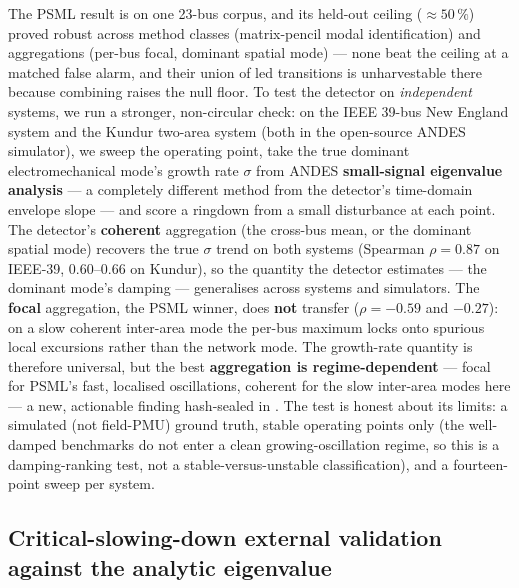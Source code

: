 \documentclass[11pt]{article}
\begin{document}
The PSML result is on one 23-bus corpus, and its held-out ceiling
($\approx 50\,\%$) proved robust across method classes (matrix-pencil
modal identification) and aggregations (per-bus focal, dominant spatial
mode) --- none beat the ceiling at a matched false alarm, and their
union of led transitions is unharvestable there because combining raises
the null floor. To test the detector on \emph{independent} systems, we
run a stronger, non-circular check: on the IEEE 39-bus New England
system and the Kundur two-area system (both in the open-source ANDES
simulator), we sweep the operating point, take the true dominant
electromechanical mode's growth rate $\sigma$ from ANDES
\textbf{small-signal eigenvalue analysis} --- a completely different
method from the detector's time-domain envelope slope --- and score a
ringdown from a small disturbance at each point. The detector's
\textbf{coherent} aggregation (the cross-bus mean, or the dominant
spatial mode) recovers the true $\sigma$ trend on both systems (Spearman
$\rho = 0.87$ on IEEE-39, 0.60--0.66 on Kundur), so the quantity the
detector estimates --- the dominant mode's damping --- generalises
across systems and simulators. The \textbf{focal} aggregation, the PSML
winner, does \textbf{not} transfer ($\rho = -0.59$ and $-0.27$): on a
slow coherent inter-area mode the per-bus maximum locks onto spurious
local excursions rather than the network mode. The growth-rate quantity
is therefore universal, but the best \textbf{aggregation is
regime-dependent} --- focal for PSML's fast, localised oscillations,
coherent for the slow inter-area modes here --- a new, actionable
finding hash-sealed in
.
The test is honest about its limits: a simulated (not field-PMU) ground
truth, stable operating points only (the well-damped benchmarks do not
enter a clean growing-oscillation regime, so this is a damping-ranking
test, not a stable-versus-unstable classification), and a fourteen-point
sweep per system.

\subsection{Critical-slowing-down external validation against the
analytic eigenvalue}\label{sec:csd}
\end{document}
